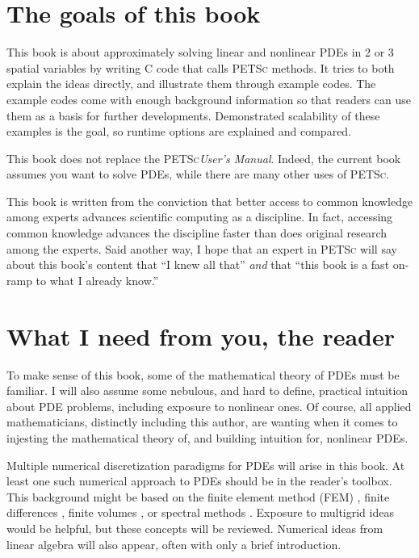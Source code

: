 \documentclass{tufte-book}
\theoremstyle{definition}
\newcommand{\PETSc}{\textsc{PETSc}\xspace}
\begin{document}
\section{The goals of this book}

This book is about approximately solving linear and nonlinear PDEs in 2 or 3 spatial variables by writing C code that calls \PETSc methods.  It tries to both explain the ideas directly, and illustrate them through example codes.  The example codes come with enough background information so that readers can use them as a basis for further developments.  Demonstrated scalability of these examples is the goal, so runtime options are explained and compared.

This book does not replace the \PETSc \emph{User's Manual}.  Indeed, the current book assumes you want to solve PDEs, while there are many other uses of \PETSc.

This book is written from the conviction that better access to common knowledge among experts advances scientific computing as a discipline.  In fact, accessing common knowledge advances the discipline faster than does original research among the experts.  Said another way, I hope that an expert in \PETSc will say about this book's content that ``I knew all that'' \emph{and} that ``this book is a fast on-ramp to what I already know.''

\section{What I need from you, the reader}

To make sense of this book, some of the mathematical theory of PDEs must be familiar.  I will also assume some nebulous, and hard to define, practical intuition about PDE problems, including exposure to nonlinear ones.  Of course, all applied mathematicians, distinctly including this author, are wanting when it comes to injesting the mathematical theory of, and building intuition for, nonlinear PDEs.

Multiple numerical discretization paradigms for PDEs will arise in this book.  At least one such numerical approach to PDEs should be in the reader's toolbox.  This background might be based on the finite element method (FEM) \citep{Braess,Elmanetal2005}, finite differences \citep{MortonMayers}, finite volumes \citep{LeVeque}, or spectral methods \citep{KarniadakisSherwin,Trefethen}.  Exposure to multigrid ideas \citep{Briggsetal2000} would be helpful, but these concepts will be reviewed.  Numerical ideas from linear algebra \citep{Greenbaum1997,TrefethenBau} will also appear, often with only a brief introduction.
\end{document}
